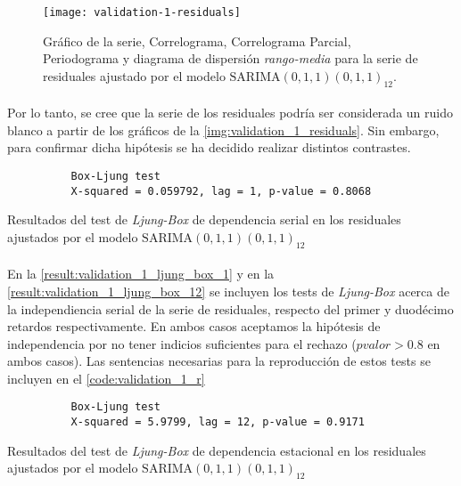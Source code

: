 \documentclass[a4paper, spanish]{article}
\begin{document}
      \begin{figure}[htb!]
        \centering
        \texttt{[image: validation-1-residuals]}
        \caption{Gráfico de la serie, Correlograma, Correlograma Parcial, Periodograma y diagrama de dispersión \emph{rango-media} para la serie de residuales ajustado por el modelo $\text{SARIMA}(0, 1, 1)(0, 1, 1)_{12}$.}
        \label{img:validation_1_residuals}
      \end{figure}

      \paragraph{}
      Por lo tanto, se cree que la serie de los residuales podría ser considerada un ruido blanco a partir de los gráficos de la \autoref{img:validation_1_residuals}. Sin embargo, para confirmar dicha hipótesis se ha decidido realizar distintos contrastes.

      \begin{table}[htb!]
        \begin{Verbatim}
          Box-Ljung test
          X-squared = 0.059792, lag = 1, p-value = 0.8068
        \end{Verbatim}
        \caption{Resultados del test de \emph{Ljung-Box} de dependencia serial en los residuales ajustados por el modelo $\text{SARIMA}(0, 1, 1)(0, 1, 1)_{12}$}
        \label{result:validation_1_ljung_box_1}
      \end{table}

      \paragraph{}
      En la \autoref{result:validation_1_ljung_box_1} y en la \autoref{result:validation_1_ljung_box_12} se incluyen los tests de \emph{Ljung-Box} acerca de la independiencia serial de la serie de residuales, respecto del primer y duodécimo retardos respectivamente. En ambos casos aceptamos la hipótesis de independencia por no tener indicios suficientes para el rechazo ($pvalor > 0.8$ en ambos casos). Las sentencias necesarias para la reproducción de estos tests se incluyen en el \autoref{code:validation_1_r}

      \begin{table}[htb!]
        \begin{Verbatim}
          Box-Ljung test
          X-squared = 5.9799, lag = 12, p-value = 0.9171
        \end{Verbatim}
        \caption{Resultados del test de \emph{Ljung-Box} de dependencia estacional en los residuales ajustados por el modelo $\text{SARIMA}(0, 1, 1)(0, 1, 1)_{12}$}
        \label{result:validation_1_ljung_box_12}
      \end{table}
\end{document}
